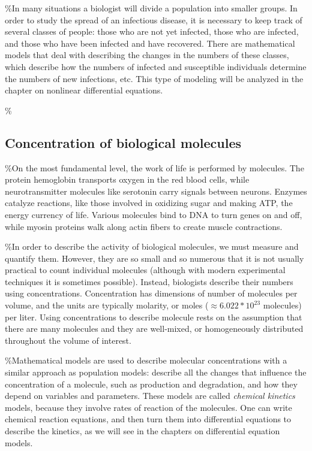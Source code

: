 \documentclass[
]{book}
\begin{document}
\%In many situations a biologist will divide a population into smaller groups. In order to study the spread of an infectious disease, it is necessary to keep track of several classes of people: those who are not yet infected, those who are infected, and those who have been infected and have recovered. There are mathematical models that deal with describing the changes in the numbers of these classes, which describe how the numbers of infected and susceptible individuals determine the numbers of new infections, etc. This type of modeling will be analyzed in the chapter on nonlinear differential equations.

\%

\subsection{Concentration of biological molecules}

\%On the most fundamental level, the work of life is performed by molecules. The protein hemoglobin transports oxygen in the red blood cells, while neurotransmitter molecules like serotonin carry signals between neurons. Enzymes catalyze reactions, like those involved in oxidizing sugar and making ATP, the energy currency of life. Various molecules bind to DNA to turn genes on and off, while myosin proteins walk along actin fibers to create muscle contractions.

\%In order to describe the activity of biological molecules, we must measure and quantify them. However, they are so small and so numerous that it is not usually practical to count individual molecules (although with modern experimental techniques it is sometimes possible). Instead, biologists describe their numbers using concentrations. Concentration has dimensions of number of molecules per volume, and the units are typically molarity, or moles (\(\approx 6.022*10^{23}\) molecules) per liter. Using concentrations to describe molecule rests on the assumption that there are many molecules and they are well-mixed, or homogeneously distributed throughout the volume of interest.

\%Mathematical models are used to describe molecular concentrations with a similar approach as population models: describe all the changes that influence the concentration of a molecule, such as production and degradation, and how they depend on variables and parameters. These models are called \emph{chemical kinetics} models, because they involve rates of reaction of the molecules. One can write chemical reaction equations, and then turn them into differential equations to describe the kinetics, as we will see in the chapters on differential equation models.
\end{document}
